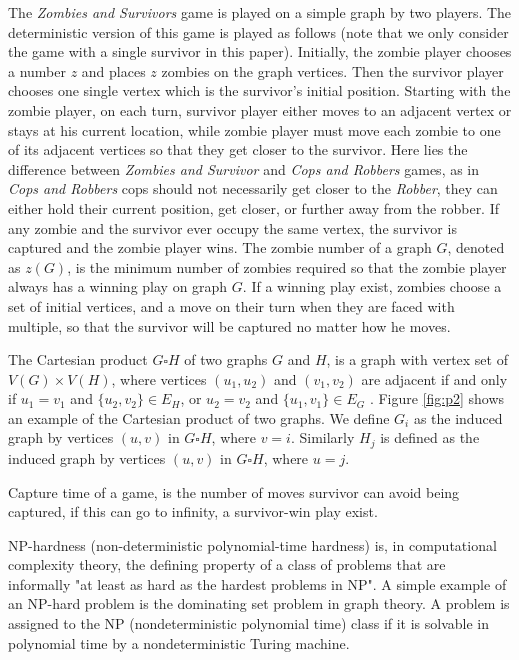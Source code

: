 \documentclass[1p]{elsarticle}
\begin{document}
The {\it Zombies and Survivors} game is played on a simple graph by two players. The deterministic version of this game
\cite{Fitz16} is played as follows (note that we only consider the game with a single survivor in this paper).
Initially, the zombie player chooses a number $z$ and places $z$ zombies on the graph vertices. Then the survivor player
chooses one single vertex which is the survivor's initial position. Starting with the zombie player, on each turn,
survivor player either moves to an adjacent vertex or stays at his current location, while zombie player must move each
zombie to one of its adjacent vertices so that they get closer to the survivor. Here lies the difference between {\it
Zombies and Survivor} and {\it Cops and Robbers} games, as in {\it Cops and Robbers} cops should not necessarily get
closer to the {\it Robber}, they can either hold their current position, get closer, or further away from the robber. If
any zombie and the survivor ever occupy the same vertex, the survivor is captured and the zombie player wins. The zombie
number of a graph $G$, denoted as $z(G)$, is the minimum number of zombies required so that the zombie player always has
a winning play on graph $G$. If a winning play exist, zombies choose a set of initial vertices, and a move on their turn
when they are faced with multiple, so that the survivor will be captured no matter how he moves.

The Cartesian product $G \square H$ of two graphs $G$ and $H$, is a graph with vertex set of $V(G) \times V(H)$, where
vertices $(u_1 , u_2)$ and $(v_1 , v_2)$ are adjacent if and only if $u_1 = v_1$ and $ \{ u_2 , v_2 \} \in E_{H} $, or
$u_2 = v_2$ and $ \{u_1 , v_1 \} \in E_{G}$ \cite{West02}. Figure \ref{fig:p2} shows an example of the Cartesian product
of two graphs. We define $G_{i}$ as the induced graph by vertices $(u,v)$ in $G \square H$, where $v=i$. Similarly
$H_{j}$ is defined as the induced graph by vertices $(u,v)$ in $G \square H$, where $u=j$.

Capture time of a game, is the number of moves survivor can avoid being captured, if this can go to infinity, a survivor-win play exist.

NP-hardness (non-deterministic polynomial-time hardness) is, in computational complexity theory, the defining property
of a class of problems that are informally "at least as hard as the hardest problems in NP". A simple example of an
NP-hard problem is the dominating set problem in graph theory. A problem is assigned to the NP (nondeterministic polynomial time) class if
it is solvable in polynomial time by a nondeterministic Turing machine.
\end{document}
